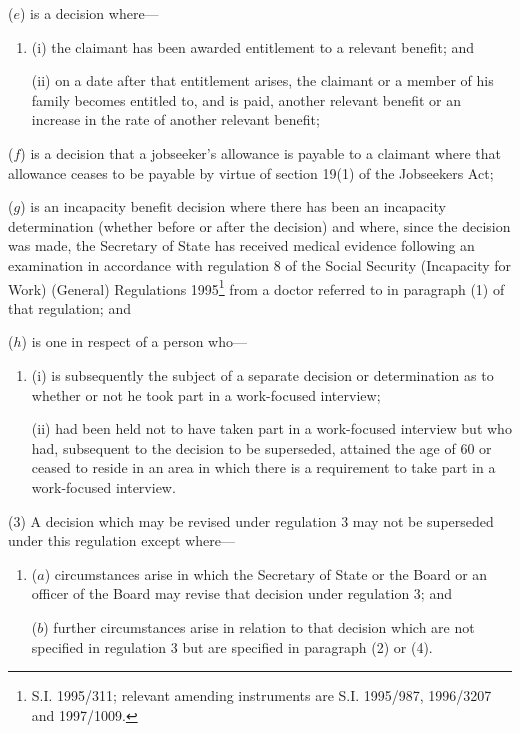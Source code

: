 \documentclass[12pt,a4paper]{article}
\begin{document}
\begin{enumerate}
($e$) is a decision where—
\begin{enumerate}\item[]
(i) the claimant has been awarded entitlement to a relevant benefit; and

(ii) on a date after that entitlement arises, the claimant or a member of his family becomes entitled to, and is paid, another relevant benefit or an increase in the rate of another relevant benefit;
\end{enumerate}


($f$) is a decision that a jobseeker’s allowance is payable to a claimant where that allowance ceases to be payable by virtue of section 19(1) of the Jobseekers Act;

($g$) is an incapacity benefit decision where there has been an incapacity determination (whether before or after the decision) and where, since the decision was made, the Secretary of State has received medical evidence following an examination in accordance with regulation 8 of the Social Security (Incapacity for Work) (General) Regulations 1995\footnote{\frenchspacing S.I. 1995/311; relevant amending instruments are S.I. 1995/987, 1996/3207 and 1997/1009.} from a doctor referred to in paragraph (1) of that regulation;
and

($h$) is one in respect of a person who—
\begin{enumerate}\item[]
(i) is subsequently the subject of a separate decision or determination as to whether or not he took part in a work-focused interview;

(ii) had been held not to have taken part in a work-focused interview but who had, subsequent to the decision to be superseded, attained the age of 60 or ceased to reside in an area in which there is a requirement to take part in a work-focused interview.
\end{enumerate}
\end{enumerate}

(3) A decision which may be revised under regulation 3 may not be superseded under this regulation except where—
\begin{enumerate}\item[]
($a$) circumstances arise in which the Secretary of State 
or the Board or an officer of the Board  %
may revise that decision under regulation 3; and

($b$) further circumstances arise in relation to that decision which are not specified in regulation 3 but are specified in paragraph (2) or (4).
\end{enumerate}
\end{document}
